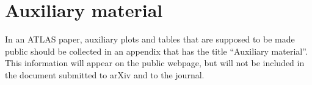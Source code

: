 \clearpage
\section*{Auxiliary material}

In an ATLAS paper, auxiliary plots and tables that are supposed to be made public 
should be collected in an appendix that has the title \enquote{Auxiliary material}.
This information will appear on the public webpage, but will not be included
in the document submitted to arXiv and to the journal.
